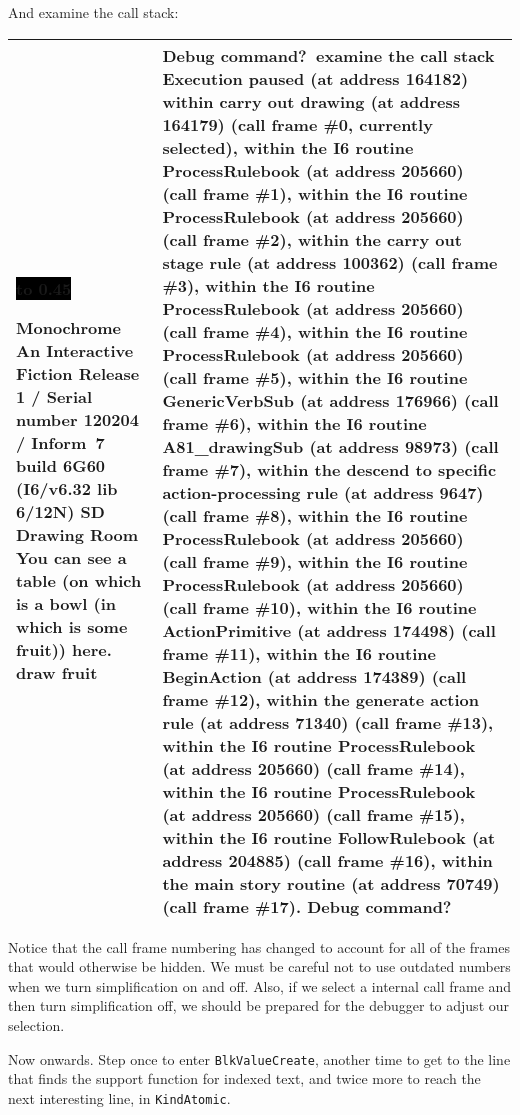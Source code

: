 \documentclass{book}
\newcommand{\n}{\hspace*{\fill}\newline}
\newcommand{\terp}[2]{\begin{center}\begin{tabular}{p{0.45\textwidth}|p{0.45\textwidth}}\midrule #1&#2\\\midrule\end{tabular}\end{center}}
\newcommand{\glkheading}[1]{\textbf{#1}}
\newcommand{\glkinput}[1]{\textbf{#1}}
\newcommand{\glkstatusline}[2]{\centerline{\colorbox{black}{\hbox to 0.45\textwidth{\textcolor{white}{#1\hfil #2}}}}}
\newcommand{\storyprompt}{\raisebox{1.5pt}{\(>\)}}
\newcommand{\cursor}{\raisebox{-1.5pt}{\RectangleThin}}
\begin{document}
And examine the call stack:

\terp{\glkstatusline{Drawing Room}{0/1}\n
  \glkheading{Monochrome}\n
  An Interactive Fiction\n
  Release 1 / Serial number 120204 / Inform~7 build 6G60 (I6/v6.32 lib 6/12N) SD\n
  \n
  \glkheading{Drawing Room}\n
  You can see a table (on which is a bowl (in which is some fruit)) here.\n
  \n
  \storyprompt\glkinput{draw fruit}}{%
  Debug command?\ \glkinput{examine the call stack}\n
  \n
  Execution paused (at address 164182)\n
  within carry out drawing (at address 164179) (call frame \#0, currently selected),\n
  within the I6 routine ProcessRulebook (at address 205660) (call frame \#1),\n
  within the I6 routine ProcessRulebook (at address 205660) (call frame \#2),\n
  within the carry out stage rule (at address 100362) (call frame \#3),\n
  within the I6 routine ProcessRulebook (at address 205660) (call frame \#4),\n
  within the I6 routine ProcessRulebook (at address 205660) (call frame \#5),\n
  within the I6 routine GenericVerbSub (at address 176966) (call frame \#6),\n
  within the I6 routine A81\_drawingSub (at address 98973) (call frame \#7),\n
  within the descend to specific action-processing rule (at address 9647) (call frame \#8),\n
  within the I6 routine ProcessRulebook (at address 205660) (call frame \#9),\n
  within the I6 routine ProcessRulebook (at address 205660) (call frame \#10),\n
  within the I6 routine ActionPrimitive (at address 174498) (call frame \#11),\n
  within the I6 routine BeginAction (at address 174389) (call frame \#12),\n
  within the generate action rule (at address 71340) (call frame \#13),\n
  within the I6 routine ProcessRulebook (at address 205660) (call frame \#14),\n
  within the I6 routine ProcessRulebook (at address 205660) (call frame \#15),\n
  within the I6 routine FollowRulebook (at address 204885) (call frame \#16),\n
  within the main story routine (at address 70749) (call frame \#17).\n
  \n
  Debug command?\ \cursor}

Notice that the call frame numbering has changed to account for all of the
frames that would otherwise be hidden.  We must be careful not to use outdated
numbers when we turn simplification on and off.  Also, if we select a internal
call frame and then turn simplification off, we should be prepared for the
debugger to adjust our selection.

Now onwards.  Step once to enter \lstinline{BlkValueCreate}, another time to get
to the line that finds the support function for indexed text, and twice more to
reach the next interesting line, in \lstinline{KindAtomic}.
\end{document}
